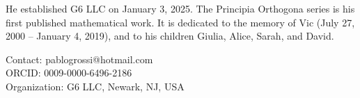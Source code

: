 \documentclass[12pt, oneside]{book}
\theoremstyle{plain}
\theoremstyle{definition}
\theoremstyle{remark}
\begin{document}
He established G6 LLC on January 3, 2025. The Principia Orthogona series is
his first published mathematical work. It is dedicated to the memory of
Vic (July 27, 2000 -- January 4, 2019), and to his children Giulia,
Alice, Sarah, and David.

\bigskip
\noindent Contact: pablogrossi@hotmail.com\\
ORCID: 0009-0000-6496-2186\\
Organization: G6 LLC, Newark, NJ, USA

\newpage
\thispagestyle{empty}
\mbox{}
\end{document}
